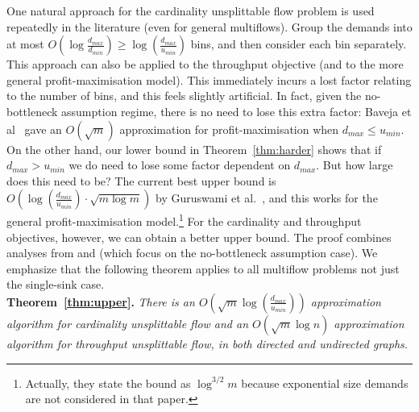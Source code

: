\documentclass[12pt]{article}
\begin{document}
One natural approach for the cardinality unsplittable flow problem is used repeatedly in the
literature  (even for general multiflows). Group the demands
into at most $O(\log \frac{d_{max}}{d_{min}}) \geq \log (\frac{d_{max}}{u_{min}})$ bins, and then consider
each bin separately. This approach can also be applied to the throughput objective (and to the
more general profit-maximisation model).
This immediately incurs a lost factor relating to the number of bins, and this
feels slightly artificial. In fact, given the no-bottleneck assumption regime, there is no need to lose this extra factor:
Baveja et al~\cite{baveja2000approximation} gave
an $O(\sqrt{m})$ approximation for profit-maximisation when $d_{max} \leq u_{min}$.
On the other hand, our lower bound in Theorem~\ref{thm:harder} shows that if $d_{max} > u_{min}$  we do need to
lose some factor dependent on $d_{max}$. But how large does this need to be?
The current best upper bound is $O(\log (\frac{d_{max}}{u_{min}})\cdot \sqrt{m \log m})$ by Guruswami et al.~\cite{guruswami2003near},
and this works for the general profit-maximisation model.\footnote{Actually, they state the bound as $\log^{3/2}m$ because
exponential size demands are not considered in that paper.}
For the cardinality and throughput objectives, however, we can obtain a better upper bound.
The proof combines analyses from \cite{baveja2000approximation} and \cite{kolliopoulos2004approximating}
(which focus on the no-bottleneck assumption case). We emphasize that the following theorem
applies to all multiflow problems not just the single-sink case.\\





{{\noindent\bf Theorem~\ref{thm:upper}.} \itshape
There is an $O(\sqrt{m}\log (\frac{d_{max}}{u_{min}}))$ approximation algorithm
for cardinality unsplittable flow and an $O(\sqrt{m}\log n)$ approximation algorithm
for throughput unsplittable flow, in both directed and undirected graphs. \\
}
\end{document}
